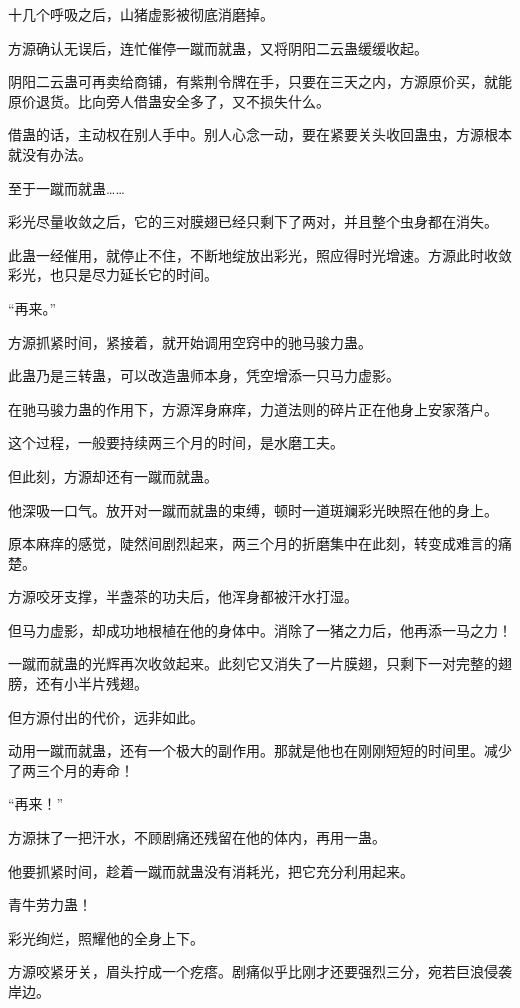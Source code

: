 \begin{this_body}
十几个呼吸之后，山猪虚影被彻底消磨掉。

方源确认无误后，连忙催停一蹴而就蛊，又将阴阳二云蛊缓缓收起。

阴阳二云蛊可再卖给商铺，有紫荆令牌在手，只要在三天之内，方源原价买，就能原价退货。比向旁人借蛊安全多了，又不损失什么。

借蛊的话，主动权在别人手中。别人心念一动，要在紧要关头收回蛊虫，方源根本就没有办法。

至于一蹴而就蛊……

彩光尽量收敛之后，它的三对膜翅已经只剩下了两对，并且整个虫身都在消失。

此蛊一经催用，就停止不住，不断地绽放出彩光，照应得时光增速。方源此时收敛彩光，也只是尽力延长它的时间。

“再来。”

方源抓紧时间，紧接着，就开始调用空窍中的驰马骏力蛊。

此蛊乃是三转蛊，可以改造蛊师本身，凭空增添一只马力虚影。

在驰马骏力蛊的作用下，方源浑身麻痒，力道法则的碎片正在他身上安家落户。

这个过程，一般要持续两三个月的时间，是水磨工夫。

但此刻，方源却还有一蹴而就蛊。

他深吸一口气。放开对一蹴而就蛊的束缚，顿时一道斑斓彩光映照在他的身上。

原本麻痒的感觉，陡然间剧烈起来，两三个月的折磨集中在此刻，转变成难言的痛楚。

方源咬牙支撑，半盏茶的功夫后，他浑身都被汗水打湿。

但马力虚影，却成功地根植在他的身体中。消除了一猪之力后，他再添一马之力！

一蹴而就蛊的光辉再次收敛起来。此刻它又消失了一片膜翅，只剩下一对完整的翅膀，还有小半片残翅。

但方源付出的代价，远非如此。

动用一蹴而就蛊，还有一个极大的副作用。那就是他也在刚刚短短的时间里。减少了两三个月的寿命！

“再来！”

方源抹了一把汗水，不顾剧痛还残留在他的体内，再用一蛊。

他要抓紧时间，趁着一蹴而就蛊没有消耗光，把它充分利用起来。

青牛劳力蛊！

彩光绚烂，照耀他的全身上下。

方源咬紧牙关，眉头拧成一个疙瘩。剧痛似乎比刚才还要强烈三分，宛若巨浪侵袭岸边。


\end{this_body}
